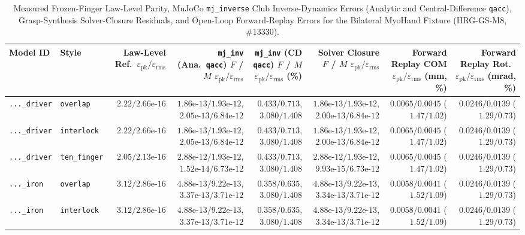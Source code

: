 \documentclass[11pt,a4paper]{article}
\begin{document}
\begin{itemize}
\end{itemize}

\begin{table}[h!]
\centering
\caption{Measured Frozen-Finger Law-Level Parity, MuJoCo \texttt{mj\_inverse} Club Inverse-Dynamics Errors (Analytic and Central-Difference \texttt{qacc}), Grasp-Synthesis Solver-Closure Residuals, and Open-Loop Forward-Replay Errors for the Bilateral MyoHand Fixture (HRG-GS-M8, \#13330).}
\label{tab:hrg-gs-m8-parity}
\scriptsize
\begin{tabular}{llrrrrrr}
\toprule
Model ID & Style & Law-Level Ref.\ $\varepsilon_{\mathrm{pk}}/\varepsilon_{\mathrm{rms}}$ & \texttt{mj\_inv} (Ana.\ \texttt{qacc}) $F$ / $M$ $\varepsilon_{\mathrm{pk}}/\varepsilon_{\mathrm{rms}}$ & \texttt{mj\_inv} (CD \texttt{qacc}) $F$ / $M$ $\varepsilon_{\mathrm{pk}}/\varepsilon_{\mathrm{rms}}$ (\%) & Solver Closure $F$ / $M$ $\varepsilon_{\mathrm{pk}}/\varepsilon_{\mathrm{rms}}$ & Forward Replay COM $\varepsilon_{\mathrm{pk}}/\varepsilon_{\mathrm{rms}}$ (mm, \%) & Forward Replay Rot.\ $\varepsilon_{\mathrm{pk}}/\varepsilon_{\mathrm{rms}}$ (mrad, \%) \\
\midrule
\texttt{...\_driver} & \texttt{overlap} & $2.22 / 2.66\text{e-}16$ & $1.86\text{e-}13/1.93\text{e-}12$, $2.05\text{e-}13/6.84\text{e-}12$ & $0.433/0.713$, $3.080/1.408$ & $1.86\text{e-}13/1.93\text{e-}12$, $2.00\text{e-}13/6.84\text{e-}12$ & $0.0065/0.0045$ ($1.47/1.02$) & $0.0246/0.0139$ ($1.29/0.73$) \\
\texttt{...\_driver} & \texttt{interlock} & $2.22 / 2.66\text{e-}16$ & $1.86\text{e-}13/1.93\text{e-}12$, $2.05\text{e-}13/6.84\text{e-}12$ & $0.433/0.713$, $3.080/1.408$ & $1.86\text{e-}13/1.93\text{e-}12$, $2.00\text{e-}13/6.84\text{e-}12$ & $0.0065/0.0045$ ($1.47/1.02$) & $0.0246/0.0139$ ($1.29/0.73$) \\
\texttt{...\_driver} & \texttt{ten\_finger} & $2.05 / 2.13\text{e-}16$ & $2.88\text{e-}12/1.93\text{e-}12$, $1.52\text{e-}14/6.73\text{e-}12$ & $0.433/0.713$, $3.080/1.408$ & $2.88\text{e-}12/1.93\text{e-}12$, $9.93\text{e-}15/6.73\text{e-}12$ & $0.0065/0.0045$ ($1.47/1.02$) & $0.0246/0.0139$ ($1.29/0.73$) \\
\texttt{...\_iron} & \texttt{overlap} & $3.12 / 2.86\text{e-}16$ & $4.88\text{e-}13/9.22\text{e-}13$, $3.37\text{e-}13/3.71\text{e-}12$ & $0.358/0.635$, $3.080/1.408$ & $4.88\text{e-}13/9.22\text{e-}13$, $3.34\text{e-}13/3.71\text{e-}12$ & $0.0058/0.0041$ ($1.52/1.09$) & $0.0246/0.0139$ ($1.29/0.73$) \\
\texttt{...\_iron} & \texttt{interlock} & $3.12 / 2.86\text{e-}16$ & $4.88\text{e-}13/9.22\text{e-}13$, $3.37\text{e-}13/3.71\text{e-}12$ & $0.358/0.635$, $3.080/1.408$ & $4.88\text{e-}13/9.22\text{e-}13$, $3.34\text{e-}13/3.71\text{e-}12$ & $0.0058/0.0041$ ($1.52/1.09$) & $0.0246/0.0139$ ($1.29/0.73$) \\

\end{tabular}
\end{table}
\end{document}
